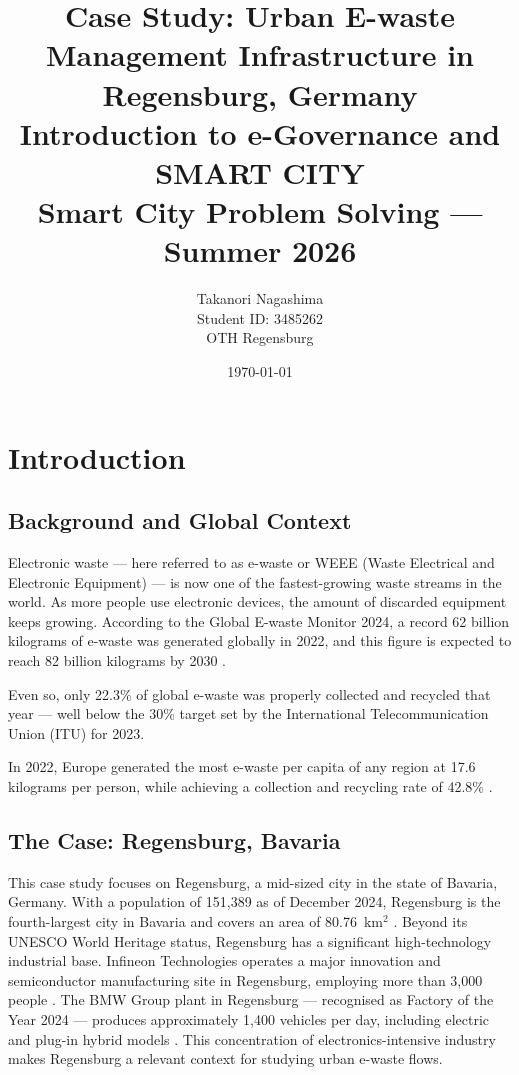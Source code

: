 \documentclass[12pt, a4paper]{article}
\title{
  \Large\textbf{Case Study: Urban E-waste Management Infrastructure in Regensburg, Germany} \\[1em]
  \large Introduction to e-Governance and SMART CITY \\
  Smart City Problem Solving --- Summer 2026
}
\author{
  Takanori Nagashima \\
  Student ID: 3485262 \\
  OTH Regensburg
}
\date{\today}
\begin{document}

\maketitle
\newpage

\section{Introduction}

\subsection{Background and Global Context}

Electronic waste --- here referred to as e-waste or WEEE (Waste Electrical and Electronic Equipment) ---
is now one of the fastest-growing waste streams in the world. As more people use electronic devices, the amount of discarded equipment keeps growing. According to the Global E-waste Monitor 2024,
a record 62 billion kilograms of e-waste was generated globally in 2022, and this
figure is expected to reach 82 billion kilograms by 2030
\cite{unitar2024}.

Even so, only 22.3\% of global e-waste was properly collected and recycled that year
--- well below the 30\% target set by the International Telecommunication Union (ITU) for 2023.

In 2022, Europe generated the most e-waste per capita of any region at 17.6 kilograms per person,
while achieving a collection and recycling rate of 42.8\%
\cite{unitar2024}.

\subsection{The Case: Regensburg, Bavaria}

This case study focuses on Regensburg, a mid-sized city in the state of Bavaria,
Germany. With a population of 151,389 as of December 2024, Regensburg is the
fourth-largest city in Bavaria and covers an area of 80.76~km$^2$
\cite{wikipedia_regensburg}. Beyond its UNESCO World Heritage status, Regensburg has a significant high-technology industrial base.
Infineon Technologies operates a major innovation and semiconductor manufacturing
site in Regensburg, employing more than 3,000 people \cite{infineon_regensburg}.
The BMW Group plant in Regensburg --- recognised as Factory of the Year 2024 ---
produces approximately 1,400 vehicles per day, including electric and plug-in
hybrid models \cite{bmw2025}. This concentration of electronics-intensive industry makes Regensburg a relevant context for studying urban e-waste flows.
\end{document}
